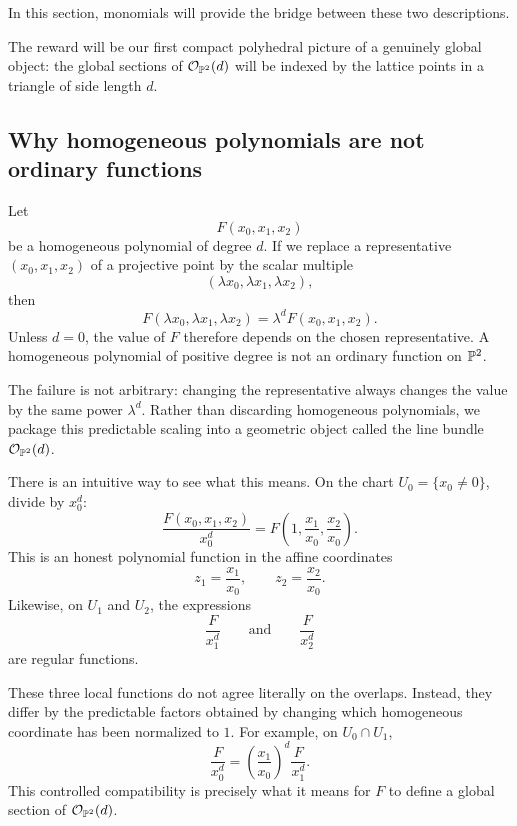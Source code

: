 In this section, monomials will provide the bridge between these two
descriptions.

The reward will be our first compact polyhedral picture of a genuinely
global object: the global sections of \(\mathcal{O}_{\mathbb{P}^2}(d)\) will be
indexed by the lattice points in a triangle of side length \(d\).

\subsection{Why homogeneous polynomials are not ordinary functions}

Let
\[
F(x_0,x_1,x_2)
\]
be a homogeneous polynomial of degree \(d\). If we replace a
representative \((x_0,x_1,x_2)\) of a projective point by the scalar
multiple
\[
(\lambda x_0,\lambda x_1,\lambda x_2),
\]
then
\[
F(\lambda x_0,\lambda x_1,\lambda x_2)
=
\lambda^dF(x_0,x_1,x_2).
\]
Unless \(d=0\), the value of \(F\) therefore depends on the chosen
representative. A homogeneous polynomial of positive degree is not an
ordinary function on \(\mathbb{P}^2\).

The failure is not arbitrary: changing the representative always
changes the value by the same power \(\lambda^d\). Rather than
discarding homogeneous polynomials, we package this predictable
scaling into a geometric object called the line bundle
\(\mathcal{O}_{\mathbb{P}^2}(d)\).

There is an intuitive way to see what this means. On the chart
\(U_0=\{x_0\neq0\}\), divide by \(x_0^d\):
\[
\frac{F(x_0,x_1,x_2)}{x_0^d}
=
F\left(1,\frac{x_1}{x_0},\frac{x_2}{x_0}\right).
\]
This is an honest polynomial function in the affine coordinates
\[
z_1=\frac{x_1}{x_0},
\qquad
z_2=\frac{x_2}{x_0}.
\]
Likewise, on \(U_1\) and \(U_2\), the expressions
\[
\frac{F}{x_1^d}
\qquad\text{and}\qquad
\frac{F}{x_2^d}
\]
are regular functions.

These three local functions do not agree literally on the overlaps.
Instead, they differ by the predictable factors obtained by changing
which homogeneous coordinate has been normalized to \(1\). For
example, on \(U_0\cap U_1\),
\[
\frac{F}{x_0^d}
=
\left(\frac{x_1}{x_0}\right)^d
\frac{F}{x_1^d}.
\]
This controlled compatibility is precisely what it means for \(F\) to
define a global section of \(\mathcal{O}_{\mathbb{P}^2}(d)\).

